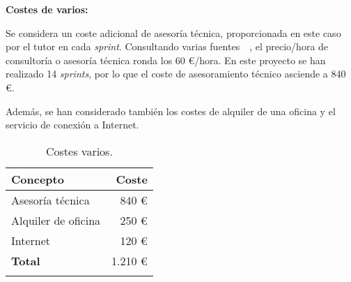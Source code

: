 \textbf{Costes de varios:}

Se considera un coste adicional de asesoría técnica, proporcionada en este caso por el tutor en cada \emph{sprint}. Consultando varias fuentes~\cite{asesoria_1}~\cite{asesoria_2}, el precio/hora de consultoría o asesoría técnica ronda los 60 \euro{}/hora. En este proyecto se han realizado 14 \emph{sprints}, por lo que el coste de asesoramiento técnico asciende a 840 \euro{}.

Además, se han considerado también los costes de alquiler de una oficina y el servicio de conexión a Internet.

\begin{longtable}[]{@{}lr@{}}
\toprule
\begin{minipage}[b]{0.3\columnwidth}\raggedright\strut
\textbf{Concepto}\strut
\end{minipage} & \begin{minipage}[b]{0.18\columnwidth}\raggedright\strut
\textbf{Coste}\strut
\end{minipage}\tabularnewline
\midrule
\endhead
\begin{minipage}[t]{0.3\columnwidth}\raggedright\strut
Asesoría técnica\strut
\end{minipage} & \begin{minipage}[t]{0.18\columnwidth}\raggedright\strut
840 \euro{}\strut
\end{minipage}\tabularnewline
\begin{minipage}[t]{0.3\columnwidth}\raggedright\strut
Alquiler de oficina\strut
\end{minipage} & \begin{minipage}[t]{0.18\columnwidth}\raggedright\strut
250 \euro{}\strut
\end{minipage}\tabularnewline
\begin{minipage}[t]{0.3\columnwidth}\raggedright\strut
Internet\strut
\end{minipage} & \begin{minipage}[t]{0.18\columnwidth}\raggedright\strut
120 \euro{}\strut
\end{minipage}\tabularnewline
\midrule
\begin{minipage}[t]{0.3\columnwidth}\raggedright\strut
\textbf{Total}\strut
\end{minipage} & \begin{minipage}[t]{0.18\columnwidth}\raggedright\strut
1.210 \euro{}\strut
\end{minipage}\tabularnewline
\bottomrule
\caption{Costes varios.}
\end{longtable}

